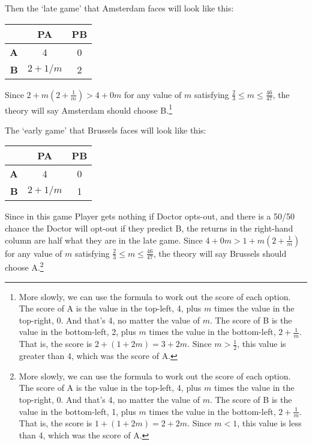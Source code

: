 \documentclass[
  12pt,
]{article}
\begin{document}
Then the `late game' that Amsterdam faces will look like this:

\begin{table}[H]
\centering
\begin{tabular}[t]{>{}r|cc}

\textbf{ } & \textbf{PA} & \textbf{PB}\\
\midrule
\textbf{A} & 4 & 0\\
\textbf{B} & $2+1/m$ & 2\\

\end{tabular}
\end{table}

Since \(2 + m(2+\frac{1}{m}) > 4 + 0m\) for any value of \(m\)
satisfying \(\frac{2}{3} \leq m \leq \frac{46}{47}\), the theory will
say Amsterdam should choose B.\footnote{More slowly, we can use the
  formula to work out the score of each option. The score of A is the
  value in the top-left, 4, plus \(m\) times the value in the top-right,
  0. And that's 4, no matter the value of \(m\). The score of B is the
  value in the bottom-left, 2, plus \(m\) times the value in the
  bottom-left, \(2 + \frac{1}{m}\). That is, the score is
  \(2 + (1 + 2m) = 3 + 2m\). Since \(m > \frac{1}{2}\), this value is
  greater than 4, which was the score of A.}

The `early game' that Brussels faces will look like this:

\begin{table}[H]
\centering
\begin{tabular}[t]{>{}r|cc}

\textbf{ } & \textbf{PA} & \textbf{PB}\\
\midrule
\textbf{A} & 4 & 0\\
\textbf{B} & $2+1/m$ & 1\\

\end{tabular}
\end{table}

Since in this game Player gets nothing if Doctor opts-out, and there is
a 50/50 chance the Doctor will opt-out if they predict B, the returns in
the right-hand column are half what they are in the late game. Since
\(4 + 0m > 1 + m(2+\frac{1}{m})\) for any value of \(m\) satisfying
\(\frac{2}{3} \leq m \leq \frac{46}{47}\), the theory will say Brussels
should choose A.\footnote{More slowly, we can use the formula to work
  out the score of each option. The score of A is the value in the
  top-left, 4, plus \(m\) times the value in the top-right, 0. And
  that's 4, no matter the value of \(m\). The score of B is the value in
  the bottom-left, 1, plus \(m\) times the value in the bottom-left,
  \(2 + \frac{1}{m}\). That is, the score is \(1 + (1 + 2m) = 2 + 2m\).
  Since \(m < 1\), this value is less than 4, which was the score of A.}
\end{document}
